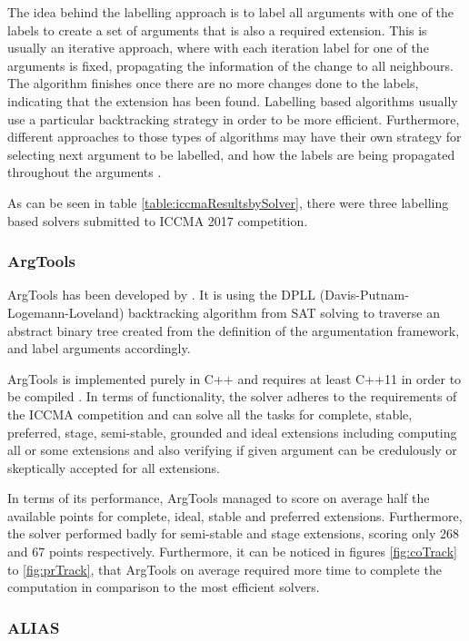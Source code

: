 The idea behind the labelling approach is to label all arguments with one of the labels to create a set of arguments that is also a required extension. This is usually an iterative approach, where with each iteration label for one of the arguments is fixed, propagating the information of the change to all neighbours. The algorithm finishes once there are no more changes done to the labels, indicating that the extension has been found. Labelling based algorithms usually use a particular backtracking strategy in order to be more efficient. Furthermore, different approaches to those types of algorithms may have their own strategy for selecting next argument to be labelled, and how the labels are being propagated throughout the arguments \citep{solvingMethods}.

As can be seen in table \ref{table:iccmaResultsbySolver}, there were three labelling based solvers submitted to ICCMA 2017 competition. 

\subsubsection{ArgTools}
ArgTools has been developed by \citet{argtools}. It is using the DPLL (Davis-Putnam-Logemann-Loveland) backtracking algorithm from SAT solving \citep{bierehandbook} to traverse an abstract binary tree created from the definition of the argumentation framework, and label arguments accordingly. 
 
ArgTools is implemented purely in C++ and requires at least C++11 in order to be compiled \citep{argtools}. In terms of functionality, the solver adheres to the requirements of the ICCMA competition and can solve all the tasks for complete, stable, preferred, stage, semi-stable, grounded and ideal extensions including computing all or some extensions and also verifying if given argument can be credulously or skeptically accepted for all extensions.

In terms of its performance, ArgTools managed to score on average half the available points for complete, ideal, stable and preferred extensions. Furthermore, the solver performed badly for semi-stable and stage extensions, scoring only 268 and 67 points respectively. Furthermore, it can be noticed in figures \ref{fig:coTrack} to \ref{fig:prTrack}, that ArgTools on average required more time to complete the computation in comparison to the most efficient solvers.

\subsubsection{ALIAS}  \label{section:alias}

